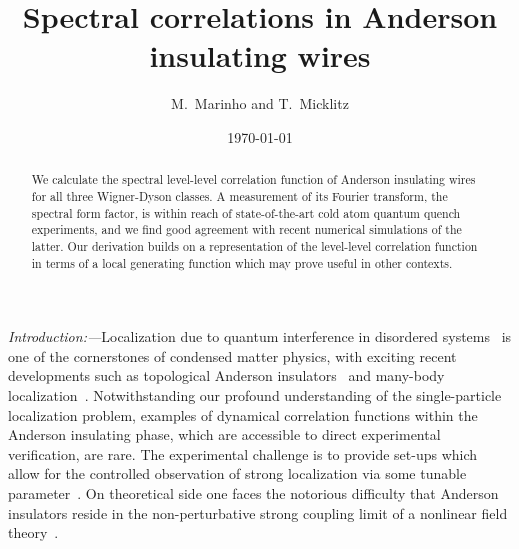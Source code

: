 \documentclass[twocolumn,showpacs,aps,prl]{revtex4}
\begin{document}
\title{Spectral correlations in Anderson insulating wires }

\author{M.~Marinho and  T.~Micklitz}


\date{\today}



\begin{abstract}

We calculate the spectral level-level correlation function of Anderson insulating wires for all three Wigner-Dyson classes. 
A measurement of its Fourier transform, the spectral form factor, is within reach of state-of-the-art 
cold atom quantum quench experiments, and  
we find good agreement  
with recent numerical simulations of the latter.
Our derivation builds on a representation of the level-level correlation function in terms of a local generating function which  
may prove useful in other contexts.  

\end{abstract}


\maketitle




{\it Introduction:---}Localization due to quantum interference in disordered systems~\cite{Anderson}
is one of the cornerstones of condensed matter physics, with 
exciting recent developments such as topological Anderson insulators~\cite{topAI3,topAI2,topAI2a,topAI2b,topAI} and 
 many-body localization~\cite{MBL1,MBL2}. Notwithstanding our profound understanding of the 
 single-particle localization problem, 
 examples of dynamical correlation functions within the Anderson insulating phase, 
 which are accessible to direct experimental verification, are rare. 
The experimental challenge is to provide set-ups 
which allow for the controlled observation of strong localization 
via some tunable parameter~\cite{StrongAL}. 
On theoretical side one faces the notorious difficulty that 
Anderson insulators reside in the
non-perturbative strong coupling limit 
of a nonlinear field theory~\cite{EfetovBook}. 
\end{document}

